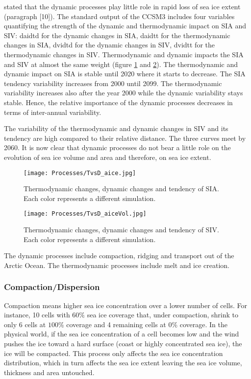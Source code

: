 \cite{ISI:000242942100008} stated that the dynamic processes play little role in rapid loss of sea ice extent (paragraph [10]). The standard output of the CCSM3 includes four variables quantifying the strength of the dynamic and thermodynamic impact on SIA and SIV: daidtd for the dynamic changes in SIA, daidtt for the thermodynamic changes in SIA, dvidtd for the dynamic changes in SIV, dvidtt for the thermodynamic changes in SIV. Thermodynamic and dynamic impacts the SIA and SIV at almost the same weight (figure \ref{daidt} and \ref{dvidt}). The thermodynamic and dynamic impact on SIA is stable until 2020 where it starts to decrease. The SIA tendency variability increases from 2000 until 2099. The thermodynamic variability increases also after the year 2000 while the dynamic variability stays stable. Hence, the relative importance of the dynamic processes decreases in terms of inter-annual variability.

The variability of the thermodynamic and dynamic changes in SIV and its tendency are high compared to their relative distance. The three curves meet by 2060. It is now clear that dynamic processes do not bear a little role on the evolution of sea ice volume and area and therefore, on sea ice extent.

\begin{figure}
\center
\noindent\texttt{[image: Processes/TvsD\_aice.jpg]}
\caption{Thermodynamic changes, dynamic changes and tendency of SIA. Each color represents a different simulation.}
\label{daidt}
\end{figure}

\begin{figure}
\center
\noindent\texttt{[image: Processes/TvsD\_aiceVol.jpg]}
\caption{Thermodynamic changes, dynamic changes and tendency of SIV. Each color represents a different simulation.}
\label{dvidt}
\end{figure}



The dynamic processes include compaction, ridging and transport out of the Arctic Ocean. The thermodynamic processes include melt and ice creation.

\subsubsection{Compaction/Dispersion}\label{compact}

Compaction means higher sea ice concentration over a lower number of cells. For instance, 10 cells with $60\%$ sea ice coverage that, under compaction, shrink to only 6 cells at $100\%$ coverage and 4 remaining cells at $0\%$ coverage. In the physical world, if the sea ice concentration of a cell becomes low and the wind pushes the ice toward a hard surface (coast or highly concentrated sea ice), the ice will be compacted. This process only affects the sea ice concentration distribution, which in turn affects the sea ice extent leaving the sea ice volume, thickness and area untouched. 

